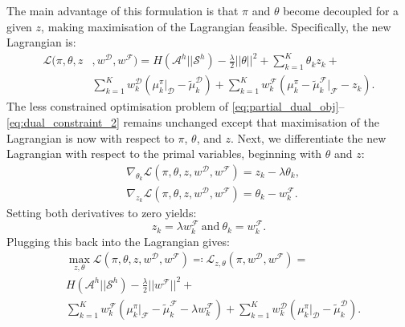 \documentclass[a4paper,11pt]{report}
\begin{document}
The main advantage of this formulation is that $\pi$ and $\theta$ become decoupled for a given $z$, making maximisation of the Lagrangian feasible.
Specifically, the new Lagrangian is:
\begin{equation}
\begin{split}
\label{eq:partial_lagrangian_failure}
\mathcal{L}(\pi,\theta,z &,w^{\mathcal{D}},w^{\mathcal{F}})=  H(\mathcal{A}^h||\mathcal{S}^h) - \frac{\lambda}{2}||\theta||^2 + \sum_{k=1}^K\theta_kz_k+\\
&
\sum_{k=1}^Kw^{\mathcal{D}}_k(\mu^{\pi}_k|_{\mathcal{D}}-\widetilde{\mu}^{\mathcal{D}}_k) + 
\sum_{k=1}^Kw^{\mathcal{F}}_k (\mu^{\pi}_k -\widetilde{\mu}^{\mathcal{F}}_k|_{\mathcal{F}} - z_k).
\end{split}
\end{equation}
The less constrained optimisation problem of \eqref{eq:partial_dual_obj}--\eqref{eq:dual_constraint_2} remains unchanged except that maximisation of the Lagrangian is now with respect to $\pi$, $\theta$, and $z$.
Next, we differentiate the new Lagrangian with respect to the primal variables, beginning with $\theta$ and $z$:
\begin{align}
	&\nabla_{\theta_k}\mathcal{L}(\pi,\theta,z,w^{\mathcal{D}},w^{\mathcal{F}}) = z_k - \lambda\theta_k,\\
	&\nabla_{z_k}\mathcal{L}(\pi,\theta,z,w^{\mathcal{D}},w^{\mathcal{F}}) = \theta_k - w^{\mathcal{F}}_k.
\end{align}
Setting both derivatives to zero yields:
\begin{equation}
	z_k = \lambda w^{\mathcal{F}}_k~\mathrm{and}~\theta_k = w^{\mathcal{F}}_k.
\end{equation}
Plugging this back into the Lagrangian gives:
\begin{equation}
\begin{split}
\label{eq:partial_lagrangian_failure_simple}
&\max_{z,\theta}\mathcal{L}(\pi,\theta,z,w^{\mathcal{D}},w^{\mathcal{F}})\eqqcolon \mathcal{L}_{z,\theta}(\pi,w^{\mathcal{D}},w^{\mathcal{F}}) =\\& H(\mathcal{A}^h||\mathcal{S}^h) - \frac{\lambda}{2}||w^{\mathcal{F}}||^2 +\\ 
&\sum_{k=1}^Kw^{\mathcal{F}}_k (\mu^{\pi}_k|_{\mathcal{F}} -\widetilde{\mu}^{\mathcal{F}}_k-\lambda w^{\mathcal{F}}_k) + \sum_{k=1}^Kw^{\mathcal{D}}_k(\mu^{\pi}_k|_{\mathcal{D}}-\widetilde{\mu}^{\mathcal{D}}_k).
\end{split}
\end{equation}
\end{document}
